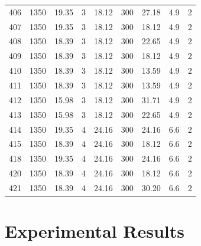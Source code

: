 \documentclass[11pt,twocolumn]{article}
\begin{document}
\begin{center}
\begin{tabular}{ccccccccc}
406    &       1350 &     19.35 &             3 &     18.12 &       300 &       27.18 &                4.9 &           2 \\
407    &       1350 &     19.35 &             3 &     18.12 &       300 &       18.12 &                4.9 &           2 \\
408    &       1350 &     18.39 &             3 &     18.12 &       300 &       22.65 &                4.9 &           2 \\
409    &       1350 &     18.39 &             3 &     18.12 &       300 &       18.12 &                4.9 &           2 \\
410    &       1350 &     18.39 &             3 &     18.12 &       300 &       13.59 &                4.9 &           2 \\
411    &       1350 &     18.39 &             3 &     18.12 &       300 &       13.59 &                4.9 &           2 \\
412    &       1350 &     15.98 &             3 &     18.12 &       300 &       31.71 &                4.9 &           2 \\
413    &       1350 &     15.98 &             3 &     18.12 &       300 &       22.65 &                4.9 &           2 \\
414    &       1350 &     19.35 &             4 &     24.16 &       300 &       24.16 &                6.6 &           2 \\
415    &       1350 &     18.39 &             4 &     24.16 &       300 &       18.12 &                6.6 &           2 \\
418    &       1350 &     19.35 &             4 &     24.16 &       300 &       24.16 &                6.6 &           2 \\
420    &       1350 &     18.39 &             4 &     24.16 &       300 &       18.12 &                6.6 &           2 \\
421    &       1350 &     18.39 &             4 &     24.16 &       300 &       30.20 &                6.6 &           2 \\
\midrule
\end{tabular}
\end{center}

\section{Experimental Results}
\end{document}
